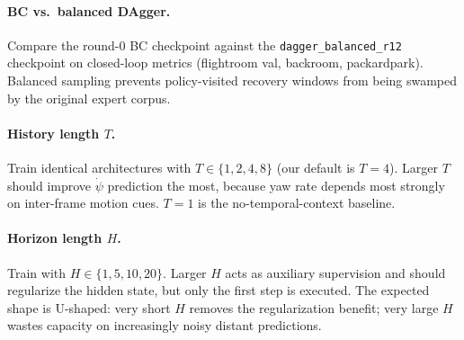 \documentclass[10pt,twocolumn,letterpaper]{article}
\begin{document}
\paragraph{BC vs.\ balanced DAgger.} Compare the round-$0$ BC checkpoint against the \texttt{dagger\_balanced\_r12} checkpoint on closed-loop metrics (flightroom val, backroom, packardpark). Balanced sampling prevents policy-visited recovery windows from being swamped by the original expert corpus.

\paragraph{History length $T$.} Train identical architectures with $T \in \{1, 2, 4, 8\}$ (our default is $T{=}4$). Larger $T$ should improve $\dot{\psi}$ prediction the most, because yaw rate depends most strongly on inter-frame motion cues. $T{=}1$ is the no-temporal-context baseline.

\paragraph{Horizon length $H$.} Train with $H \in \{1, 5, 10, 20\}$. Larger $H$ acts as auxiliary supervision and should regularize the hidden state, but only the first step is executed. The expected shape is U-shaped: very short $H$ removes the regularization benefit; very large $H$ wastes capacity on increasingly noisy distant predictions.
\end{document}
